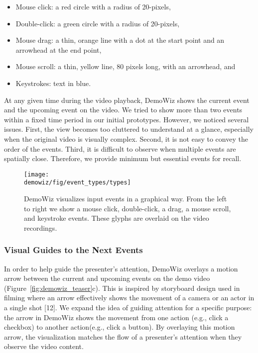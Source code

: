 \begin{itemize}
  \itemsep -2pt
  \item Mouse click: a red circle with a radius of 20-pixels,
  \item Double-click: a green circle with a radius of 20-pixels,
  \item Mouse drag: a thin, orange line with a dot at the start point and an arrowhead at the end point,
  \item Mouse scroll: a thin, yellow line, 80 pixels long, with an arrowhead, and
  \item Keystrokes: text in blue.
\end{itemize}

At any given time during the video playback, DemoWiz shows the current event and the upcoming event on the video. We tried to show more than two events within a fixed time period in our initial prototypes. However, we noticed several issues. First, the view becomes too cluttered to understand at a glance, especially when the original video is visually complex. Second, it is not easy to convey the order of the events. Third, it is difficult to observe when multiple events are spatially close. Therefore, we provide minimum but essential events for recall.

\begin{figure*}[t]
  \centering
  \texttt{[image: \\demowiz/fig/event\_types/types]}
  \caption{DemoWiz visualizes input events in a graphical way. From the left to right we show a mouse click, double-click, a drag, a mouse scroll, and keystroke events. These glyphs are overlaid on the video recordings.}
  \label{fig:demowiz_glyphs}
\end{figure*}


\subsubsection{Visual Guides to the Next Events}
In order to help guide the presenter's attention, DemoWiz overlays a motion arrow between the current and upcoming events on the demo video (Figure~\ref{fig:demowiz_teaser}c). This is inspired by storyboard design used in filming where an arrow effectively shows the movement of a camera or an actor in a single shot [12]. We expand the idea of guiding attention for a specific purpose: the arrow in DemoWiz shows the movement from one action (e.g., click a checkbox) to another action(e.g., click a button). By overlaying this motion arrow, the visualization matches the flow of a presenter's attention when they observe the video content.

